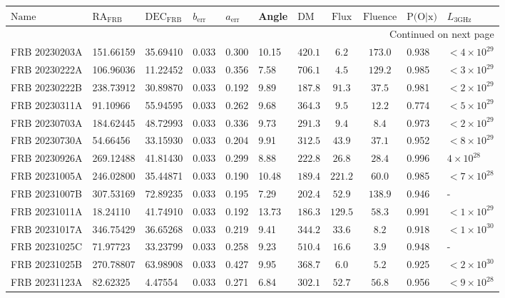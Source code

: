 \begin{longtable}{lllllllccll}
\toprule
$\text{Name}$ & $\text{RA}_{\text{FRB}}$ & $\text{DEC}_{\text{FRB}}$ & $b_{\text{err}}$ & $a_{\text{err}}$ & Angle & $\text{DM}$ & $\text{Flux}$ & $\text{Fluence}$ & $\text{P(O} \vert \text{x)}$ & $L_\text{3GHz}$ \\
\midrule
\endhead
\midrule
\multicolumn{11}{r}{Continued on next page} \\
\midrule
\endfoot
\bottomrule
\endlastfoot
FRB 20230203A & 151.66159 & 35.69410 & 0.033 & 0.300 & 10.15 & $420.1$ & $6.2$ & $173.0$ & 0.938 & $<4\times10^{29}$ \\
FRB 20230222A & 106.96036 & 11.22452 & 0.033 & 0.356 & 7.58 & $706.1$ & $4.5$ & $129.2$ & 0.985 & $<3\times10^{29}$ \\
FRB 20230222B & 238.73912 & 30.89870 & 0.033 & 0.192 & 9.89 & $187.8$ & $91.3$ & $37.5$ & 0.981 & $<2\times10^{29}$ \\
FRB 20230311A & 91.10966 & 55.94595 & 0.033 & 0.262 & 9.68 & $364.3$ & $9.5$ & $12.2$ & 0.774 & $<5\times 10^{29}$ \\
FRB 20230703A & 184.62445 & 48.72993 & 0.033 & 0.336 & 9.73 & $291.3$ & $9.4$ & $8.4$ & 0.973 & $<2\times10^{29}$ \\
FRB 20230730A & 54.66456 & 33.15930 & 0.033 & 0.204 & 9.91 & $312.5$ & $43.9$ & $37.1$ & 0.952 & $<8\times10^{29}$ \\
FRB 20230926A & 269.12488 & 41.81430 & 0.033 & 0.299 & 8.88 & $222.8$ & $26.8$ & $28.4$ & 0.996 & $ 4\times10^{28}$ \\
FRB 20231005A & 246.02800 & 35.44871 & 0.033 & 0.190 & 10.48 & $189.4$ & $221.2$ & $60.0$ & 0.985 & $<7\times10^{28}$ \\
FRB 20231007B & 307.53169 & 72.89235 & 0.033 & 0.195 & 7.29 & $202.4$ & $52.9$ & $138.9$ & 0.946 & - \\
FRB 20231011A & 18.24110 & 41.74910 & 0.033 & 0.192 & 13.73 & $186.3$ & $129.5$ & $58.3$ & 0.991 & $<1\times10^{29}$ \\
FRB 20231017A & 346.75429 & 36.65268 & 0.033 & 0.219 & 9.41 & $344.2$ & $33.6$ & $8.2$ & 0.918 & $<1\times10^{30}$ \\
FRB 20231025C & 71.97723 & 33.23799 & 0.033 & 0.258 & 9.23 & $510.4$ & $16.6$ & $3.9$ & 0.948 & - \\
FRB 20231025B & 270.78807 & 63.98908 & 0.033 & 0.427 & 9.95 & $368.7$ & $6.0$ & $5.2$ & 0.925 & $<2\times10^{30}$ \\
FRB 20231123A & 82.62325 & 4.47554 & 0.033 & 0.271 & 6.84 & $302.1$ & $52.7$ & $56.8$ & 0.956 & $<9\times10^{28}$ \\

\end{longtable}
